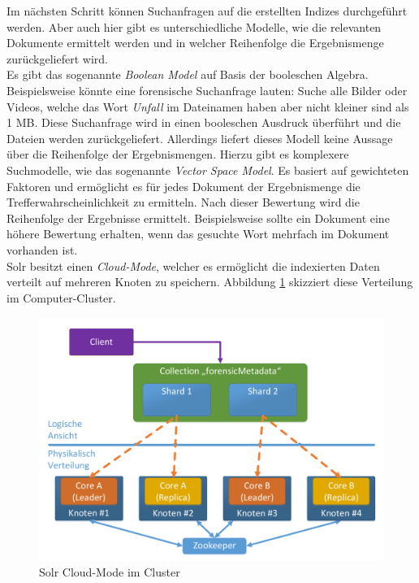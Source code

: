 \noindent
Im nächsten Schritt können Suchanfragen auf die erstellten Indizes durchgeführt werden. Aber auch hier gibt es unterschiedliche Modelle, wie die relevanten Dokumente ermittelt werden und in welcher Reihenfolge die Ergebnismenge zurückgeliefert wird.\\
Es gibt das sogenannte \textit{Boolean Model} auf Basis der booleschen Algebra. Beispielsweise könnte eine forensische Suchanfrage lauten: Suche alle Bilder oder Videos, welche das Wort \textit{Unfall} im Dateinamen haben aber nicht kleiner sind als 1 MB. Diese Suchanfrage wird in einen booleschen Ausdruck überführt und die Dateien werden zurückgeliefert. Allerdings liefert dieses Modell keine Aussage über die Reihenfolge der Ergebnismengen. Hierzu gibt es komplexere Suchmodelle, wie das sogenannte \textit{Vector Space Model}. Es basiert auf gewichteten Faktoren und ermöglicht es für jedes Dokument der Ergebnismenge die Trefferwahrscheinlichkeit zu ermitteln. Nach dieser Bewertung wird die Reihenfolge der Ergebnisse ermittelt. Beispielsweise sollte ein Dokument eine höhere Bewertung erhalten, wenn das gesuchte Wort mehrfach im Dokument vorhanden ist.\cite[S. 47 ff]{solr_search}\\

\noindent
Solr besitzt einen \textit{Cloud-Mode}, welcher es ermöglicht die indexierten Daten verteilt auf mehreren Knoten zu speichern. Abbildung \ref{fig:solr_cluster_architecture} skizziert diese Verteilung im Computer-Cluster.\\

\begin{figure}[ht]
  \centering
  \includegraphics[width=\textwidth]{./resource/solr_cluster_architecture.pdf}
  \caption{Solr Cloud-Mode im Cluster}
  \label{fig:solr_cluster_architecture}
\end{figure}

